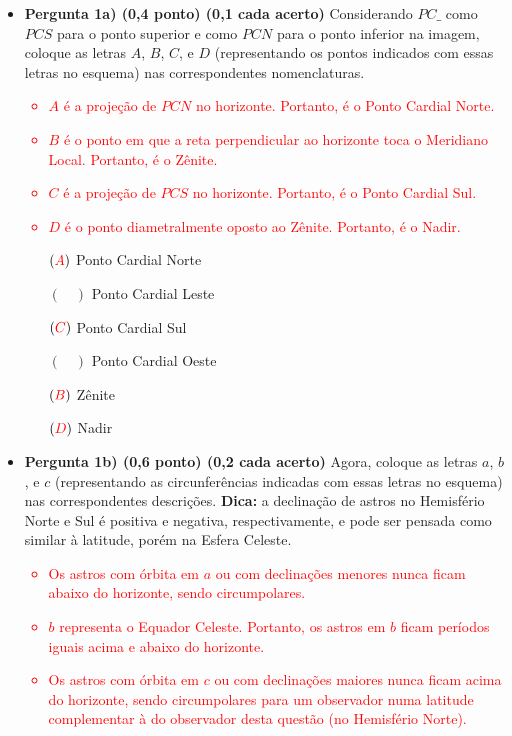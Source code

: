 \documentclass[a4paper, 12pt]{article}
\newcommand{\red}[1]{\textcolor{red}{#1}}
\begin{document}
\begin{flushleft}
\begin{itemize}
\begin{itemize}
				\item \textbf{Pergunta 1a) (0,4 ponto) (0,1 cada acerto)} Considerando $PC\_$ como $PCS$ para o ponto superior e como $PCN$ para o ponto inferior na imagem, coloque as letras $A$, $B$, $C$, e $D$ (representando os pontos indicados com essas letras no esquema) nas correspondentes nomenclaturas.
					\red{\begin{itemize}
						\item $A$ é a projeção de $PCN$ no horizonte. Portanto, é o Ponto Cardial Norte.
						\item $B$ é o ponto em que a reta perpendicular ao horizonte toca o Meridiano Local. Portanto, é o Zênite.
						\item $C$ é a projeção de $PCS$ no horizonte. Portanto, é o Ponto Cardial Sul.
						\item $D$ é o ponto diametralmente oposto ao Zênite. Portanto, é o Nadir.
					\end{itemize}}
					\begin{multicols}{3} \begin{itemize}
						\item[$(\red{A})$] Ponto Cardial Norte
						\item[$(\quad)$] Ponto Cardial Leste
						\item[$(\red{C})$] Ponto Cardial Sul
						\item[$(\quad)$] Ponto Cardial Oeste
						\item[$(\red{B})$] Zênite
						\item[$(\red{D})$] Nadir
					\end{itemize} \end{multicols}
				\item \textbf{Pergunta 1b) (0,6 ponto) (0,2 cada acerto)} Agora, coloque as letras $a$, $b$, e $c$ (representando as circunferências indicadas com essas letras no esquema) nas correspondentes descrições. \linebreak
					\textbf{Dica:} a declinação de astros no Hemisfério Norte e Sul é positiva e negativa, respectivamente, e pode ser pensada como similar à latitude, porém na Esfera Celeste.
					\red{\begin{itemize}
						\item Os astros com órbita em $a$ ou com declinações menores nunca ficam abaixo do horizonte, sendo circumpolares.
						\item $b$ representa o Equador Celeste. Portanto, os astros em $b$ ficam períodos iguais acima e abaixo do horizonte.
						\item Os astros com órbita em $c$ ou com declinações maiores nunca ficam acima do horizonte, sendo circumpolares para um observador numa latitude complementar à do observador desta questão (no Hemisfério Norte).

\end{itemize}}
\end{itemize}
\end{itemize}
\end{flushleft}
\end{document}
